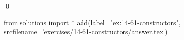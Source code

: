 
\begin{ex}
  \label{ex:14-61-constructors}
  
  \qed
\end{ex}
\begin{python0}
from solutions import *
add(label="ex:14-61-constructors",
    srcfilename='exercises/14-61-constructors/answer.tex')
\end{python0}

